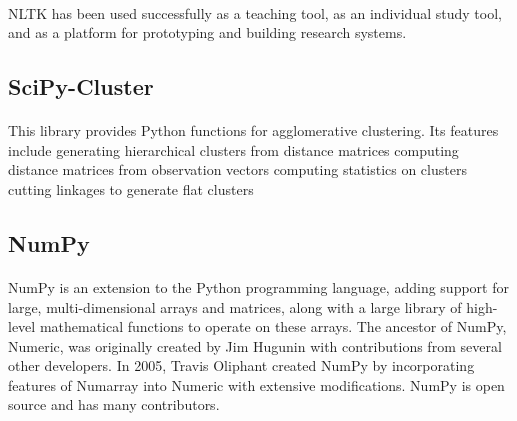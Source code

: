 \paragraph{} NLTK has been used successfully as a teaching tool, as an individual study tool, and as a platform for prototyping and building research systems.
\subsection{SciPy-Cluster}
\paragraph{}This library provides Python functions for agglomerative clustering. Its features include  
generating hierarchical clusters from distance matrices 
computing distance matrices from observation vectors 
computing statistics on clusters 
cutting linkages to generate flat clusters 
\subsection{NumPy}
\paragraph{} NumPy is an extension to the Python programming language, adding support for large, multi-dimensional arrays and matrices, along with a large library of high-level mathematical functions to operate on these arrays. The ancestor of NumPy, Numeric, was originally created by Jim Hugunin with contributions from several other developers. In 2005, Travis Oliphant created NumPy by incorporating features of Numarray into Numeric with extensive modifications. NumPy is open source and has many contributors.



    
